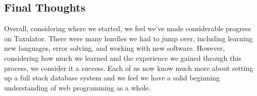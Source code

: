 \documentclass[sigconf]{acmart}
\begin{document}
\subsection{Final Thoughts}
Overall, considering where we started, we feel we've made considerable progress on Taxulator. There were many hurdles we had to jump over, including learning new languages, error solving, and working with new software. However, considering how much we learned and the experience we gained through this process, we consider it a success. Each of us now know much more about setting up a full stack database system and we feel we have a solid beginning understanding of web programming as a whole.




\end{document}
